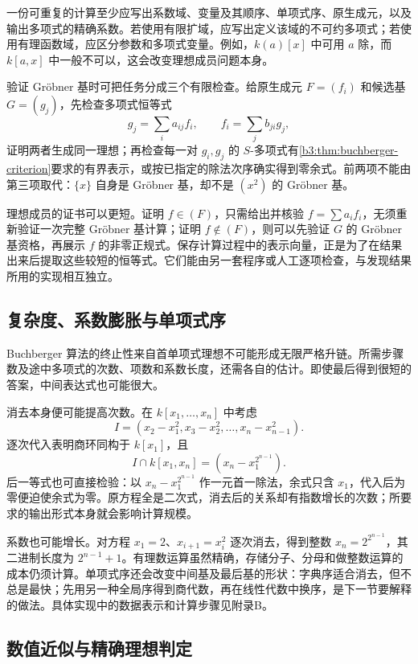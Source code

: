 一份可重复的计算至少应写出系数域、变量及其顺序、单项式序、原生成元，以及输出多项式的精确系数。若使用有限扩域，应写出定义该域的不可约多项式；若使用有理函数域，应区分参数和多项式变量。例如，\(k(a)[x]\) 中可用 \(a\) 除，而 \(k[a,x]\) 中一般不可以，这会改变理想成员问题本身。

\ProseParagraphBreak
验证 Gröbner 基时可把任务分成三个有限检查。给原生成元 \(F=(f_i)\) 和候选基 \(G=(g_j)\)，先检查多项式恒等式
\[
	g_j=\sum_i a_{ij}f_i,\qquad f_i=\sum_j b_{ji}g_j,
\]
证明两者生成同一理想；再检查每一对 \(g_i,g_j\) 的 \(S\)-多项式有\cref{b3:thm:buchberger-criterion}要求的有界表示，或按已指定的除法次序确实得到零余式。前两项不能由第三项取代：\(\{x\}\) 自身是 Gröbner 基，却不是 \((x^2)\) 的 Gröbner 基。

\ProseParagraphBreak
理想成员的证书可以更短。证明 \(f\in(F)\)，只需给出并核验 \(f=\sum a_if_i\)，无须重新验证一次完整 Gröbner 基计算；证明 \(f\notin(F)\)，则可以先验证 \(G\) 的 Gröbner 基资格，再展示 \(f\) 的非零正规式。保存计算过程中的表示向量，正是为了在结果出来后提取这些较短的恒等式。它们能由另一套程序或人工逐项检查，与发现结果所用的实现相互独立。

\subsection{复杂度、系数膨胀与单项式序}
\label{b3:subsec:0804:03}

Buchberger 算法的终止性来自首单项式理想不可能形成无限严格升链。所需步骤数及途中多项式的次数、项数和系数长度，还需各自的估计。即使最后得到很短的答案，中间表达式也可能很大。

\ProseParagraphBreak
消去本身便可能提高次数。在 \(k[x_1,\ldots,x_n]\) 中考虑
\[
	I=(x_2-x_1^2,x_3-x_2^2,\ldots,x_n-x_{n-1}^2).
\]
逐次代入表明商环同构于 \(k[x_1]\)，且
\[
	I\cap k[x_1,x_n]=(x_n-x_1^{2^{n-1}}).
\]
后一等式也可直接检验：以 \(x_n-x_1^{2^{n-1}}\) 作一元首一除法，余式只含 \(x_1\)，代入后为零便迫使余式为零。原方程全是二次式，消去后的关系却有指数增长的次数；所要求的输出形式本身就会影响计算规模。

\ProseParagraphBreak
系数也可能增长。对方程 \(x_1=2\)、\(x_{i+1}=x_i^2\) 逐次消去，得到整数 \(x_n=2^{2^{n-1}}\)，其二进制长度为 \(2^{n-1}+1\)。有理数运算虽然精确，存储分子、分母和做整数运算的成本仍须计算。单项式序还会改变中间基及最后基的形状：字典序适合消去，但不总是最快；先用另一种全局序得到商代数，再在线性代数中换序，是下一节要解释的做法。具体实现中的数据表示和计算步骤见附录B。

\subsection{数值近似与精确理想判定}
\label{b3:subsec:0804:04}

